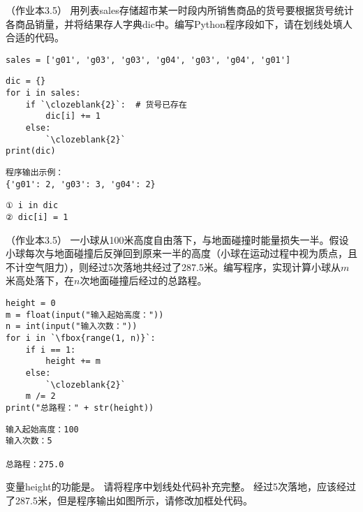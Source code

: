 \begin{groups}
\begin{questions}[rp]
\setcounter{qnumber}{1}
\question （{\kaishu 作业本3.5}）
用列表sales存储超市某一时段内所销售商品的货号要根据货号统计各商品销量，并将结果存人字典dic中。编写Python程序段如下，请在划线处填人合适的代码。
\begin{lstlisting}
sales = ['g01', 'g03', 'g03', 'g04', 'g03', 'g04', 'g01']
\end{lstlisting}
\begin{paracol}{2}
\begin{lstlisting}
dic = {}
for i in sales:
    if `\clozeblank{2}`:  # 货号已存在
        dic[i] += 1
    else:
        `\clozeblank{2}`
print(dic)
\end{lstlisting}
\switchcolumn
\begin{lstlisting}[frame=single]
程序输出示例：
{'g01': 2, 'g03': 3, 'g04': 2}
\end{lstlisting}
\end{paracol}

\begin{solution}
\begin{lstlisting}
① i in dic
② dic[i] = 1
\end{lstlisting}
\end{solution}



\setcounter{qnumber}{1}
\question （{\kaishu 作业本3.5}）
一小球从100米高度自由落下，与地面碰撞时能量损失一半。假设小球每次与地面碰撞后反弹回到原来一半的高度（小球在运动过程中视为质点，且不计空气阻力），则经过5次落地共经过了287.5米。编写程序，实现计算小球从$m$米高处落下，在$n$次地面碰撞后经过的总路程。
\begin{paracol}{2}
\begin{lstlisting}
height = 0
m = float(input("输入起始高度："))
n = int(input("输入次数："))
for i in `\fbox{range(1, n)}`:
    if i == 1:
        height += m
    else:
        `\clozeblank{2}`
    m /= 2
print("总路程：" + str(height))
\end{lstlisting}
\switchcolumn
\begin{lstlisting}[frame=single]
输入起始高度：100
输入次数：5

总路程：275.0
\end{lstlisting}
\end{paracol}
\begin{subquestions}
\subquestion 变量height的功能是。
\subquestion 请将程序中划线处代码补充完整。
\subquestion 经过5次落地，应该经过了287.5米，但是程序输出如图所示，请修改加框处代码。
\end{subquestions}


\end{questions}
\end{groups}
